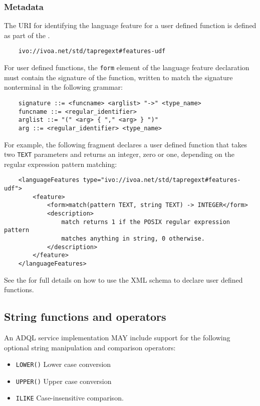 \documentclass[11pt,a4paper]{ivoa}
\begin{document}
\subsubsection{Metadata}
\label{sec:user.metadata}

The URI for identifying the language feature for a user defined function
is defined as part of the \TAPRegSpec{}.

\begin{verbatim}
    ivo://ivoa.net/std/tapregext#features-udf
\end{verbatim}

For user defined functions, the \verb:form: element of the language feature
declaration must contain the signature of the function, written to match
the signature nonterminal in the following grammar:
\begin{verbatim}
    signature ::= <funcname> <arglist> "->" <type_name>
    funcname ::= <regular_identifier>
    arglist ::= "(" <arg> { "," <arg> } ")"
    arg ::= <regular_identifier> <type_name>
\end{verbatim}

For example, the following fragment declares a user defined function that
takes two \verb:TEXT: parameters and returns an integer, zero or one,
depending on the regular expression pattern matching:
\begin{verbatim}
    <languageFeatures type="ivo://ivoa.net/std/tapregext#features-udf">
        <feature>
            <form>match(pattern TEXT, string TEXT) -> INTEGER</form>
            <description>
                match returns 1 if the POSIX regular expression pattern
                matches anything in string, 0 otherwise.
            </description>
        </feature>
    </languageFeatures>
\end{verbatim}

See the \TAPRegSpec{} for full details on how to use the
XML schema to declare user defined functions.

\subsection{String functions and operators}
\label{sec:string.functions}

An ADQL service implementation MAY include support for the following optional
string manipulation and comparison operators:

\begin{itemize}
    \item \verb:LOWER(): Lower case conversion
    \item \verb:UPPER(): Upper case conversion
    \item \verb:ILIKE: Case-insensitive comparison.
\end{itemize}
\end{document}
